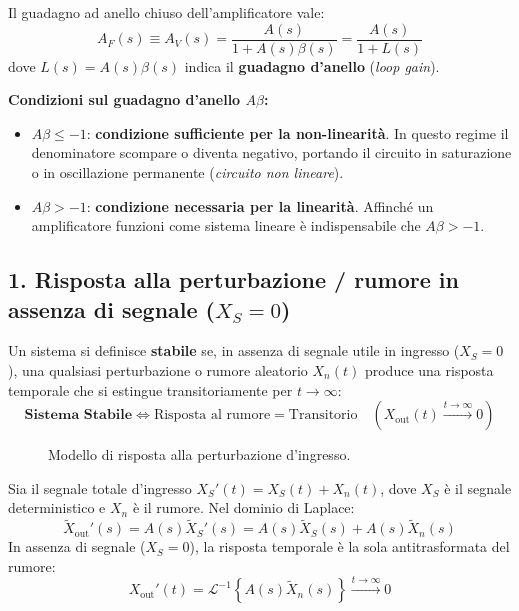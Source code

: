 Il guadagno ad anello chiuso dell'amplificatore vale:
\[
    A_F(s) \equiv A_V(s) = \frac{A(s)}{1 + A(s)\beta(s)} = \frac{A(s)}{1 + L(s)}
\]
dove $L(s) = A(s)\beta(s)$ indica il \textbf{guadagno d'anello} (\emph{loop gain}).

\begin{important}
\textbf{Condizioni sul guadagno d'anello $A\beta$:}
\begin{itemize}
    \item $A\beta \le -1$: \textbf{condizione sufficiente per la non-linearità}. In questo regime il denominatore scompare o diventa negativo, portando il circuito in saturazione o in oscillazione permanente (\emph{circuito non lineare}).
    \item $A\beta > -1$: \textbf{condizione necessaria per la linearità}. Affinché un amplificatore funzioni come sistema lineare è indispensabile che $A\beta > -1$.
\end{itemize}
\end{important}

\subsection{1. Risposta alla perturbazione / rumore in assenza di segnale ($X_S = 0$)}

Un sistema si definisce \textbf{stabile} se, in assenza di segnale utile in ingresso ($X_S = 0$), una qualsiasi perturbazione o rumore aleatorio $X_n(t)$ produce una risposta temporale che si estingue transitoriamente per $t \to \infty$:
\[
    \textbf{Sistema Stabile} \iff \text{Risposta al rumore} = \text{Transitorio} \quad (X_{\text{out}}(t) \xrightarrow{t \to \infty} 0)
\]

\begin{figure}[H]
\centering
{}
\caption{Modello di risposta alla perturbazione d'ingresso.}
\end{figure}

Sia il segnale totale d'ingresso $X_S'(t) = X_S(t) + X_n(t)$, dove $X_S$ è il segnale deterministico e $X_n$ è il rumore. Nel dominio di Laplace:
\[
    \tilde{X}_{\text{out}}'(s) = A(s) \tilde{X}_S'(s) = A(s) \tilde{X}_S(s) + A(s) \tilde{X}_n(s)
\]
In assenza di segnale ($X_S = 0$), la risposta temporale è la sola antitrasformata del rumore:
\[
    X_{\text{out}}'(t) = \mathcal{L}^{-1}\left\{ A(s) \tilde{X}_n(s) \right\} \xrightarrow{t \to \infty} 0
\]

